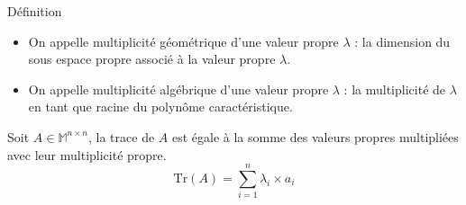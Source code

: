 \begin{bclogo}[couleur=blue!30,couleurBord=blue,arrondi=0.1,logo=\bcbook,ombre=true]{Définition}
\begin{itemize}
    \item On appelle multiplicité géométrique d'une valeur propre $\lambda$ : la dimension du sous espace propre associé à la valeur propre $\lambda$.
    \item On appelle multiplicité algébrique d'une valeur propre $\lambda$ : la multiplicité de $\lambda$ en tant que racine du polynôme caractéristique.
\end{itemize}
\end{bclogo}
\begin{prop}
Soit $A\in\mathbb{M}^{n\times n}$, la trace de $A$ est égale à la somme des valeurs propres multipliées avec leur multiplicité propre.
$$\text{Tr}(A)=\sum_{i=1}^n \lambda_i\times a_i$$
\end{prop}

